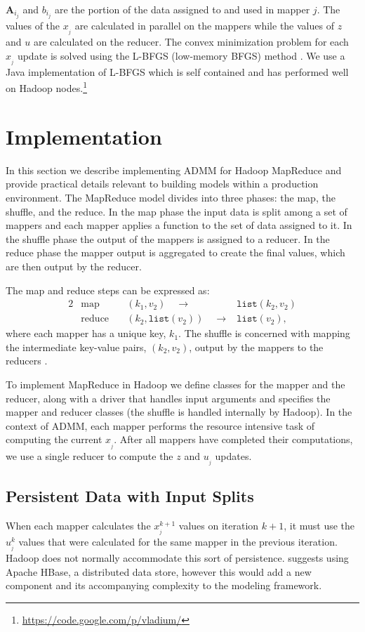 \documentclass[10pt, conference, compsocconf]{IEEEtran}
\begin{document}
$\mathbf{A}_{i_j}$ and $b_{i_j}$ are the portion of the data assigned to and used in mapper $j$.  The values of the $x_{_j}$ are calculated in parallel on the mappers while the values of $z$ and $u$ are calculated on the reducer.  The convex minimization problem for each $x_{_j}$ update is solved using the L-BFGS (low-memory BFGS) method \cite{bonnans2003numerical}.  We use a Java implementation of L-BFGS which is self contained and has performed well on Hadoop nodes.\footnote{\url{https://code.google.com/p/vladium/}}

\section{Implementation}\label{sec:imp}
In this section we describe implementing ADMM for Hadoop MapReduce and provide practical details relevant to building models within a production environment.  The MapReduce model divides into three phases: the map, the shuffle, and the reduce.  In the map phase the input data is split among a set of mappers and each mapper applies a function to the set of data assigned to it.  In the shuffle phase the output of the mappers is assigned to a reducer.  In the reduce phase the mapper output is aggregated to create the final values, which are then output by the reducer.

The map and reduce steps can be expressed as:
\begin{alignat*}{2}
&\text{map}\quad &(k_1,v_2)\quad\rightarrow &\texttt{list}(k_2,v_2)\\
&\text{reduce}\quad &(k_2,\texttt{list}(v_2))\quad\rightarrow &\texttt{list}(v_2),
\end{alignat*}
where each mapper has a unique key, $k_1$.  The shuffle is concerned with mapping the intermediate key-value pairs, $(k_2,v_2)$, output by the mappers to the reducers \cite{dean2004}.

To implement MapReduce in Hadoop we define classes for the mapper and the reducer, along with a driver that handles input arguments and specifies the mapper and reducer classes (the shuffle is handled internally by Hadoop).  In the context of ADMM, each mapper performs the resource intensive task of computing the current $x_{_j}$.  After all mappers have completed their computations, we use a single reducer to compute the $z$ and $u_{_j}$ updates.

\subsection{Persistent Data with Input Splits}
When each mapper calculates the $x_{_j}^{k+1}$ values on iteration $k+1$, it must use the $u_{_j}^k$ values that were calculated for the same mapper in the previous iteration.  Hadoop does not normally accommodate this sort of persistence.  \cite{boyd} suggests using Apache HBase, a distributed data store, however this would add a new component and its accompanying complexity to the modeling framework.
\end{document}
